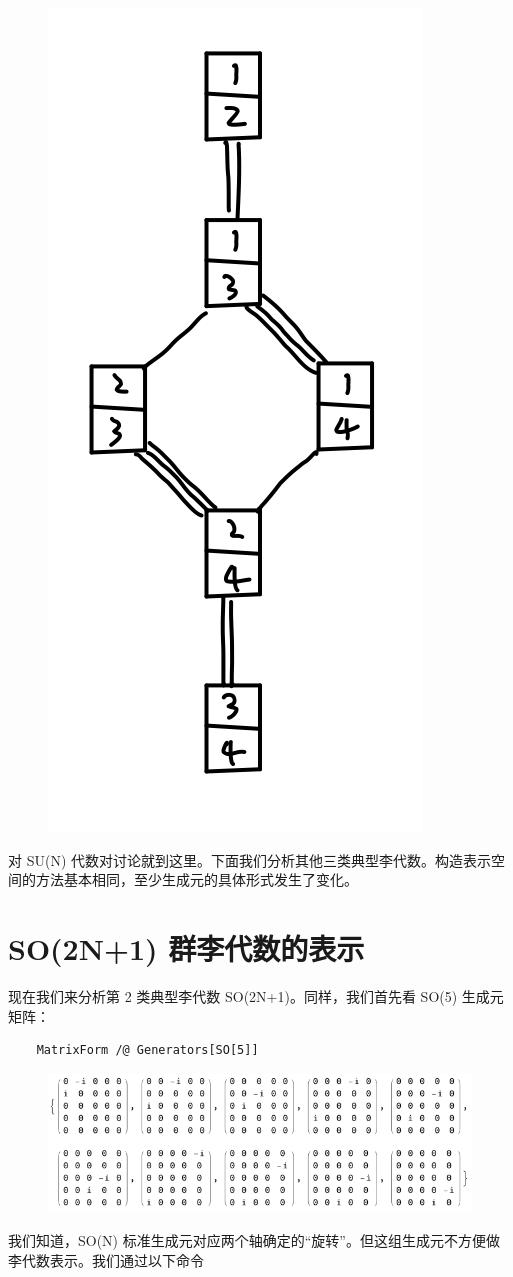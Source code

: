 \documentclass[UTF8]{ctexart}
\begin{document}
\begin{figure}[H]
\begin{centering}
\includegraphics[width=0.3\linewidth]{include/T5}
\par\end{centering}
\end{figure}

\noindent 对 SU(N) 代数对讨论就到这里。下面我们分析其他三类典型李代数。构造表示空间的方法基本相同，至少生成元的具体形式发生了变化。

\section*{SO(2N+1) 群李代数的表示}
\noindent 现在我们来分析第 2 类典型李代数 SO(2N+1)。同样，我们首先看 SO(5) 生成元矩阵：
\begin{verbatim}
	MatrixForm /@ Generators[SO[5]]
\end{verbatim}

\begin{figure}[H]
\begin{centering}
\includegraphics[width=0.8\linewidth]{include/O10}
\par\end{centering}
\end{figure}

\noindent 我们知道，SO(N) 标准生成元对应两个轴确定的“旋转”。但这组生成元不方便做李代数表示。我们通过以下命令
\end{document}
